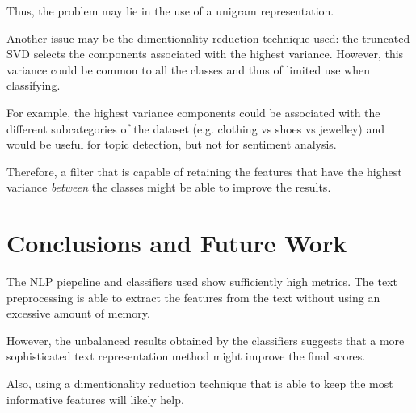 Thus, the problem may lie in the use of a unigram representation.

Another issue may be the dimentionality reduction technique used: the truncated SVD selects the components associated with the highest variance. However, this variance could be common to all the classes and thus of limited use when classifying.

For example, the highest variance components could be associated with the different subcategories of the dataset (e.g. clothing vs shoes vs jewelley) and would be useful for topic detection, but not for sentiment analysis.

Therefore, a filter that is capable of retaining the features that have the highest variance \textit{between} the classes might be able to improve the results.


\section{Conclusions and Future Work}
The NLP piepeline and classifiers used show sufficiently high metrics. The text preprocessing is able to extract the features from the text without using an excessive amount of memory.

However, the unbalanced results obtained by the classifiers suggests that a more sophisticated text representation method might improve the final scores.

Also, using a dimentionality reduction technique that is able to keep the most informative features will likely help.

\printbibliography
